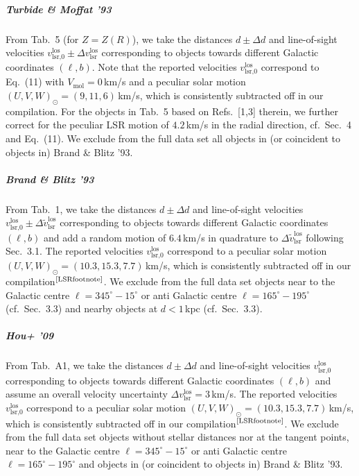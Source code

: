\documentclass[twocolumn,prd,reprint,preprintnumbers,amsmath,amssymb,superscriptaddress,nofootinbib]{revtex4}
\begin{document}
\subparagraph{Turbide \& Moffat '93 \cite{TurbideMoffat1993}} From Tab.~5 (for $Z=Z(R)$), we take the distances $d\pm \Delta d$ and line-of-sight velocities $v_{\textrm{lsr,0}}^{\textrm{los}}\pm \Delta v_{\textrm{lsr}}^{\textrm{los}}$ corresponding to objects towards different Galactic coordinates $(\ell,b)$. Note that the reported velocities $v_{\textrm{lsr,0}}^{\textrm{los}}$ correspond to Eq.~(11) with $V_{\text{mol}}=0\,$km/s and a peculiar solar motion $(U,V,W)_{\odot}=(9,11,6)\,$km/s, which is consistently subtracted off in our compilation. For the objects in Tab.~5 based on Refs.~[1,3] therein, we further correct for the peculiar LSR motion of $4.2\,$km/s in the radial direction, cf.~Sec.~4 and Eq.~(11). We exclude from the full data set all objects in (or coincident to objects in) Brand \& Blitz '93.

\subparagraph{Brand \& Blitz '93 \cite{BrandBlitz1993}} From Tab.~1, we take the distances $d\pm \Delta d$ and line-of-sight velocities $v_{\textrm{lsr,0}}^{\textrm{los}}\pm \Delta \tilde{v}_{\textrm{lsr}}^{\textrm{los}}$ corresponding to objects towards different Galactic coordinates $(\ell,b)$ and add a random motion of $6.4\,$km/s in quadrature to $\Delta \tilde{v}_{\textrm{lsr}}^{\textrm{los}}$ following Sec.~3.1. The reported velocities $v_{\textrm{lsr,0}}^{\textrm{los}}$ correspond to a peculiar solar motion $(U,V,W)_{\odot}=(10.3,15.3,7.7)\,$km/s, which is consistently subtracted off in our compilation$^\text{\ref{LSRfootnote}}$. We exclude from the full data set objects near to the Galactic centre $\ell=345^{\circ}-15^{\circ}$ or anti Galactic centre $\ell=165^{\circ}-195^{\circ}$ (cf.~Sec.~3.3) and nearby objects at $d<1\,$kpc (cf.~Sec.~3.3).

\subparagraph{Hou+ '09 \cite{Hou2009}} From Tab.~A1, we take the distances $d\pm \Delta d$ and line-of-sight velocities $v_{\textrm{lsr,0}}^{\textrm{los}}$ corresponding to objects towards different Galactic coordinates $(\ell,b)$ and assume an overall velocity uncertainty $\Delta v_{\textrm{lsr}}^{\textrm{los}}=3\,$km/s. The reported velocities $v_{\textrm{lsr,0}}^{\textrm{los}}$ correspond to a peculiar solar motion $(U,V,W)_{\odot}=(10.3,15.3,7.7)\,$km/s, which is consistently subtracted off in our compilation$^\text{\ref{LSRfootnote}}$. We exclude from the full data set objects without stellar distances nor at the tangent points, near to the Galactic centre $\ell=345^{\circ}-15^{\circ}$ or anti Galactic centre $\ell=165^{\circ}-195^{\circ}$ and objects in (or coincident to objects in) Brand \& Blitz '93.
\end{document}

